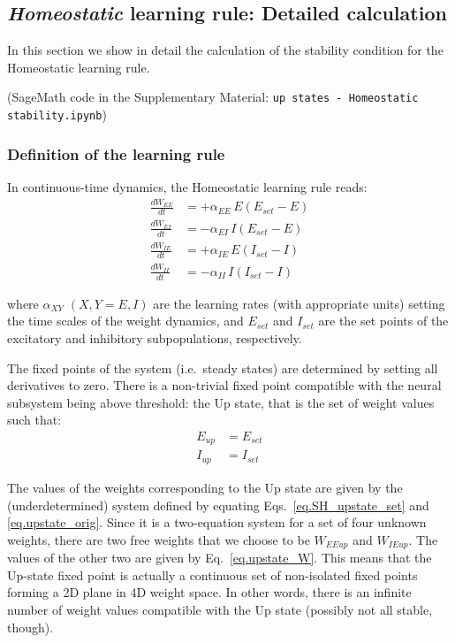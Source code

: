 \documentclass[twocolumn]{article}
\newcommand{\EE}{\mathit{EE}}
\newcommand{\EI}{\mathit{EI}}
\newcommand{\IE}{\mathit{IE}}
\newcommand{\II}{\mathit{II}}
\newcommand{\XY}{\mathit{XY}}
\newcommand{\set}{\mathit{set}}
\newcommand{\up}{\mathit{up}}
\begin{document}
\subsection{{\em Homeostatic} learning rule: Detailed calculation}
\label{sec.SH_details}

In this section we show in detail the calculation of the stability condition for the Homeostatic learning rule.

(SageMath code in the Supplementary Material: {\tt up states - Homeostatic stability.ipynb})


\subsubsection{Definition of the learning rule}

In continuous-time dynamics, the Homeostatic learning rule reads:
\begin{equation}
\begin{aligned}
\frac{dW_{\EE}}{dt} & = +\alpha_{\EE} \, E (E_{\set} - E) \\
\frac{dW_{\EI}}{dt} & = -\alpha_{\EI} \, I (E_{\set} - E) \\
\frac{dW_{\IE}}{dt} & = +\alpha_{\IE} \, E (I_{\set} - I) \\
\frac{dW_{\II}}{dt} & = -\alpha_{\II} \, I (I_{\set} - I)
\end{aligned}
\label{eq.SH_equation}
\end{equation}

\noindent where $\alpha_{\XY}$ $(X,Y=E,I)$ are the learning rates (with appropriate units) setting the time scales of the weight dynamics, and $E_{\set}$ and $I_{\set}$ are the set points of the excitatory and inhibitory subpopulations, respectively.

The fixed points of the system (i.e.\ steady states) are determined by setting all derivatives to zero. There is a non-trivial fixed point compatible with the neural subsystem being above threshold: the Up state, that is the set of weight values such that:
\begin{equation}
\begin{aligned}
E_{\up} & = E_{\set} \\
I_{\up} & = I_{\set}
\end{aligned}
\label{eq.SH_upstate_set}
\end{equation}

\noindent The values of the weights corresponding to the Up state are given by the (underdetermined) system defined by equating Eqs.\ \ref{eq.SH_upstate_set} and \ref{eq.upstate_orig}. Since it is a two-equation system for a set of four unknown weights, there are two free weights that we choose to be $W_{\EE\up}$ and $W_{\IE\up}$. The values of the other two are given by Eq.\ \ref{eq.upstate_W}. This means that the Up-state fixed point is actually a continuous set of non-isolated fixed points forming a 2D plane in 4D weight space. In other words, there is an infinite number of weight values compatible with the Up state (possibly not all stable, though).
\end{document}
